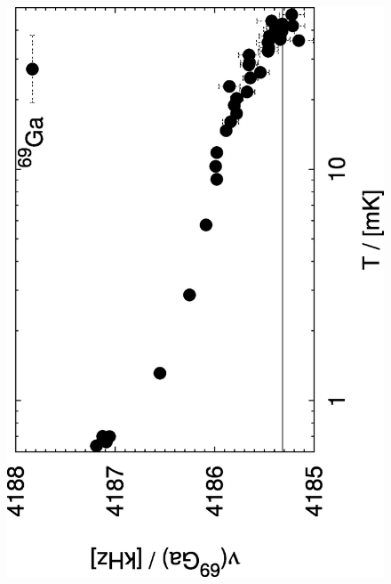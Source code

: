  \begin{figure}[htp]
	\begin{center}
		\includegraphics[angle=-90,width=\ssmallwidth]{plots/knight_aug1197da_3}\\

\end{center}
\end{figure}
